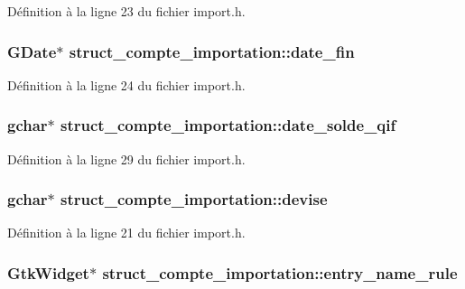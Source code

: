Définition à la ligne 23 du fichier import.h.

\subsubsection[{date\_\-fin}]{\setlength{\rightskip}{0pt plus 5cm}GDate$\ast$ {\bf struct\_\-compte\_\-importation::date\_\-fin}}\label{structstruct__compte__importation_aeb1a31dd01d33a5e8c9534e6c71490a7}


Définition à la ligne 24 du fichier import.h.

\subsubsection[{date\_\-solde\_\-qif}]{\setlength{\rightskip}{0pt plus 5cm}gchar$\ast$ {\bf struct\_\-compte\_\-importation::date\_\-solde\_\-qif}}\label{structstruct__compte__importation_a1e445710edd182ae1fec5cc094aeb8ed}


Définition à la ligne 29 du fichier import.h.

\subsubsection[{devise}]{\setlength{\rightskip}{0pt plus 5cm}gchar$\ast$ {\bf struct\_\-compte\_\-importation::devise}}\label{structstruct__compte__importation_a1b5632b0fd43c57a888151bbb68de21e}


Définition à la ligne 21 du fichier import.h.

\subsubsection[{entry\_\-name\_\-rule}]{\setlength{\rightskip}{0pt plus 5cm}GtkWidget$\ast$ {\bf struct\_\-compte\_\-importation::entry\_\-name\_\-rule}}\label{structstruct__compte__importation_a58f4a96d0afb16f16f615c729250a94a}


